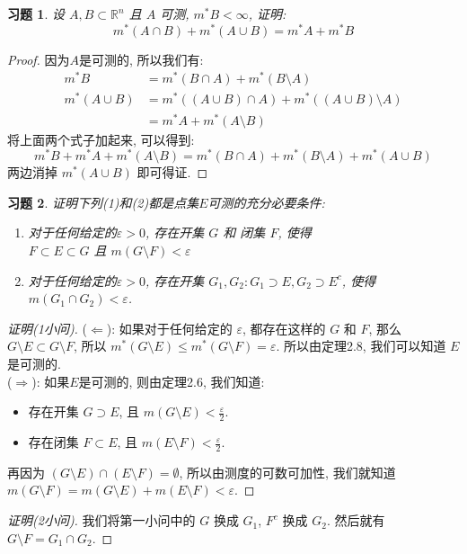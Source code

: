 \documentclass{article}
\newtheorem{exercise}{习题}
\begin{document}
\begin{exercise}
  设 $A, B\subset \mathbb{R}^n$ 且 $A$ 可测, $m^*B < \infty$, 证明:
  \[m^*(A\cap B) + m^*(A\cup B) = m^*A + m^*B\]
\end{exercise}
\begin{proof}
  因为$A$是可测的, 所以我们有:
  \begin{align*}
    m^*B &= m^*(B\cap A) + m^*(B\setminus A) \\
    m^*(A\cup B) &= m^*((A\cup B)\cap A) + m^*((A\cup B)\setminus A) \\
    &= m^*A + m^*(A\setminus B)
  \end{align*}
  将上面两个式子加起来, 可以得到:
  \[m^*B + m^*A + m^*(A\setminus B) = m^*(B\cap A) + m^*(B\setminus A) + m^*(A\cup B)\]
  两边消掉 $m^*(A\cup B)$ 即可得证.
\end{proof}
\begin{exercise}
  证明下列(1)和(2)都是点集$E$可测的充分必要条件:
  \begin{enumerate}
  \item 对于任何给定的$\varepsilon > 0$, 存在开集 $G$ 和 闭集 $F$, 使得 \\
    $F\subset E \subset G$ 且 $m(G\setminus F) < \varepsilon$
  \item 对于任何给定的$\varepsilon > 0$, 存在开集 $G_1, G_2: G_1\supset E, G_2\supset E^c$, 使得\\ $m(G_1\cap G_2) < \varepsilon$.
  \end{enumerate}
\end{exercise}
\begin{proof}[证明(1小问)]
  ($\Leftarrow$): 如果对于任何给定的 $\varepsilon$, 都存在这样的 $G$ 和 $F$, 那么
  $G\setminus E\subset G\setminus F$, 所以 $m^*(G\setminus E) \leq  m^*(G\setminus F) = \varepsilon$. 所以由定理2.8, 我们可以知道 $E$ 是可测的. \\
  ($\Rightarrow$): 如果$E$是可测的, 则由定理2.6, 我们知道:
  \begin{itemize}
  \item 存在开集 $G \supset E$, 且 $m(G\setminus E) < \frac{\varepsilon}{2}$.
  \item 存在闭集 $F \subset E$, 且 $m(E\setminus F) < \frac{\varepsilon}{2}$.
  \end{itemize}
  再因为 $(G\setminus E) \cap (E\setminus F) = \emptyset$, 所以由测度的可数可加性, 我们就知道 $m(G\setminus F) = m(G\setminus E) + m(E\setminus F) < \varepsilon$.
\end{proof}
\begin{proof}[证明(2小问)]
  我们将第一小问中的 $G$ 换成 $G_1$, $F^c$ 换成 $G_2$.
  然后就有 $G\setminus F = G_1 \cap G_2$.
\end{proof}
\end{document}
